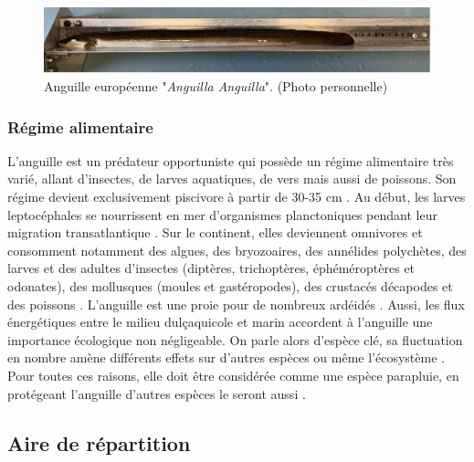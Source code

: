 \documentclass[11pt,titlepage,twoside]{article}\usepackage[]{graphicx}\usepackage[table]{xcolor}
\begin{document}
\begin{figure}[htpb]
\centering
\includegraphics[width=\textwidth]{Morpho.jpg}
\caption{Anguille européenne "\textit{Anguilla Anguilla}". (Photo personnelle)}
\label{Morpho}
\end{figure}

\subsubsection{Régime alimentaire}


L’anguille est un prédateur opportuniste qui possède un régime alimentaire très varié, allant d’insectes, de larves aquatiques, de vers mais aussi de poissons. Son régime devient exclusivement piscivore à partir de 30-35 cm \citep{feunteun_commercially_2011}. Au début, les larves leptocéphales se nourrissent en mer d’organismes planctoniques pendant leur migration transatlantique \citep{riemann_qualitative_2010}. 
Sur le continent, elles deviennent omnivores et consomment notamment des algues, des bryozoaires, des annélides polychètes, des larves et des adultes d’insectes (diptères, trichoptères, éphéméroptères et odonates), des mollusques (moules et gastéropodes), des crustacés décapodes et des poissons \citep{pasquaud_determination_2010, jobling_eel_2004}. L’anguille est une proie pour de nombreux ardéidés \citep{feunteun_assessment_1994}.
Aussi, les flux énergétiques entre le milieu dulçaquicole et marin accordent à l’anguille une importance écologique non négligeable. On parle alors d’espèce clé, sa fluctuation en nombre amène différents effets sur d’autres espèces ou même l’écosystème \citep{willson_anadromous_1995}. Pour toutes ces raisons, elle doit être considérée comme une espèce parapluie, en protégeant l’anguille d’autres espèces le seront aussi \citep{baisez_outil_2005}.

\subsection{Aire de répartition}
	
\end{document}
